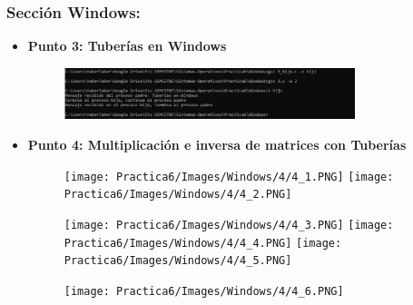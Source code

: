 \documentclass[12pt]{article}
\begin{document}
\begin{itemize}
\begin{figure}[h!]
                \end{figure}
        \end{itemize}
                   
        
      \subsubsection{Sección Windows:}
      \begin{itemize}
      
          \item[\Checkmark] \textbf{Punto 3: Tuberías en Windows} 
                \begin{figure}[h!]
                        \centering
                       \includegraphics[width=0.8\textwidth]{Practica6/Images/Windows/3.PNG}
                \end{figure}
            \newpage
            \item[\Checkmark] \textbf{Punto 4: Multiplicación e inversa de matrices con Tuberías} 
                \begin{figure}[h!]
                        \centering
                       \texttt{[image: Practica6/Images/Windows/4/4\_1.PNG]}
                       \texttt{[image: Practica6/Images/Windows/4/4\_2.PNG]}
                \end{figure}
                 \begin{figure}[h!]
                        \centering
                       
                       \texttt{[image: Practica6/Images/Windows/4/4\_3.PNG]}
                       \texttt{[image: Practica6/Images/Windows/4/4\_4.PNG]}
                       \texttt{[image: Practica6/Images/Windows/4/4\_5.PNG]}
                \end{figure}
                \clearpage
                \begin{figure}[h!]
                        \centering
                    
                   \texttt{[image: Practica6/Images/Windows/4/4\_6.PNG]}
                   

\end{figure}
\end{itemize}
\end{document}
